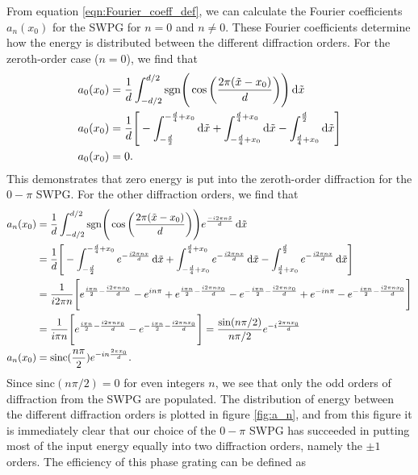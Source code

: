 From equation \ref{eqn:Fourier_coeff_def}, we can calculate the Fourier coefficients $a_n(x_0)$ for the SWPG for $n=0$ and $n\neq0$.  These Fourier coefficients determine how the energy is distributed between the different diffraction orders.  For the zeroth-order case ($n=0$), we find that
\begin{equation}
\label{eqn:a0_no_zeta}
\begin{aligned}
a_0(x_0) &= \frac{1}{d}\int_{-d/2}^{d/2} \mathrm{sgn}\Bigg( \cos\bigg( \frac{2\pi(\tilde{x}-x_0)}{d}\bigg)\Bigg) \mathop{}\!\mathrm{d}\tilde{x}\\
a_0(x_0) &=\frac{1}{d}\Bigg[ -\int_{-\frac{d}{2}}^{-\frac{d}{4}+x_0}\mathop{}\!\mathrm{d}\tilde{x} 
+\int_{-\frac{d}{4}+x_0}^{\frac{d}{4}+x_0}\mathop{}\!\mathrm{d}\tilde{x}
-\int_{\frac{d}{4}+x_0}^{\frac{d}{2}}\mathop{}\!\mathrm{d}\tilde{x}
\Bigg]\\
a_0(x_0) &=0.
\end{aligned}
\end{equation}
This demonstrates that zero energy is put into the zeroth-order diffraction for the $0-\pi$ SWPG.  For the other diffraction orders, we find that
\begingroup
\allowdisplaybreaks
\begin{equation}
\label{eqn:swpg_fourier_coeff_a_n}
	\begin{aligned}
		a_n(x_0) &= \frac{1}{d}\int_{-d/2}^{d/2} \mathrm{sgn}\Bigg( \cos\bigg( \frac{2\pi(\tilde{x}-x_0)}{d}\bigg)\Bigg) e^{\frac{-i2\pi n\tilde{x}}{d}}\mathop{}\!\mathrm{d}\tilde{x}\\
		&=\frac{1}{d}\Bigg[ -\int_{-\frac{d}{2}}^{-\frac{d}{4}+x_0} e^{-\frac{i2\pi n x}{d}}\mathop{}\!\mathrm{d}\tilde{x} 
		+\int_{-\frac{d}{4}+x_0}^{\frac{d}{4}+x_0} e^{-\frac{i2\pi n x}{d}}\mathop{}\!\mathrm{d}\tilde{x}
		-\int_{\frac{d}{4}+x_0}^{\frac{d}{2}} e^{-\frac{i2\pi n x}{d}}\mathop{}\!\mathrm{d}\tilde{x}
		\Bigg]\\
		&=\frac{1}{i2\pi n}\Bigg[
		e^{\frac{i\pi n}{2}-\frac{i2\pi n x_0}{d}} - e^{i n \pi}
		+ e^{\frac{i\pi n}{2}-\frac{i2\pi n x_0}{d}} - e^{-\frac{i\pi n}{2}-\frac{i2\pi n x_0}{d}}
		+e^{-i n \pi} - e^{-\frac{i\pi n}{2}-\frac{i2\pi n x_0}{d}}
		\Bigg]\\
		&=\frac{1}{i\pi n}\Bigg[e^{\frac{i\pi n}{2}-\frac{i2\pi n x_0}{d}}-e^{-\frac{i\pi n}{2}-\frac{i2\pi n x_0}{d}} \Bigg] = \frac{\sin (n\pi/2)}{n\pi/2}e^{-i\frac{2\pi n x_0}{d}}\\
		a_n(x_0) &= \mathrm{sinc}(\frac{n\pi}{2})e^{-i n \frac{2\pi x_0}{d}}.
	\end{aligned}
\end{equation}
\endgroup
Since $\mathrm{sinc}(n\pi/2)=0$ for even integers $n$, we see that only the odd orders of diffraction from the SWPG  are populated. The distribution of energy between the different diffraction orders is plotted in figure \ref{fig:a_n}, and from this figure it is immediately clear that our choice of the $0-\pi$ SWPG has succeeded in putting most of the input energy equally into two diffraction orders, namely the $\pm1$ orders.  The efficiency of this phase grating can be defined as
